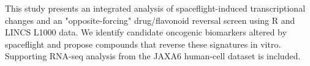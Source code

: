 This study presents an integrated analysis of spaceflight-induced transcriptional changes and an "opposite-forcing" drug/flavonoid reversal screen using R and LINCS L1000 data. We identify candidate oncogenic biomarkers altered by spaceflight and propose compounds that reverse these signatures in vitro. Supporting RNA-seq analysis from the JAXA6 human-cell dataset is included.
